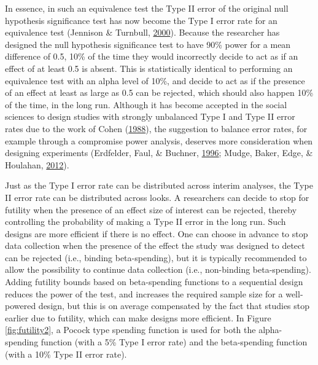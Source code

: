 \documentclass[
  english,
  ,man,floatsintext]{apa6}
\begin{document}
In essence, in such an equivalence test the Type II error of the original null hypothesis significance test has now become the Type I error rate for an equivalence test (Jennison \& Turnbull, \protect\hyperlink{ref-jennison_group_2000}{2000}). Because the researcher has designed the null hypothesis significance test to have 90\% power for a mean difference of 0.5, 10\% of the time they would incorrectly decide to act as if an effect of at least 0.5 is absent. This is statistically identical to performing an equivalence test with an alpha level of 10\%, and decide to act as if the presence of an effect at least as large as 0.5 can be rejected, which should also happen 10\% of the time, in the long run. Although it has become accepted in the social sciences to design studies with strongly unbalanced Type I and Type II error rates due to the work of Cohen (\protect\hyperlink{ref-cohen_statistical_1988}{1988}), the suggestion to balance error rates, for example through a compromise power analysis, deserves more consideration when designing experiments (Erdfelder, Faul, \& Buchner, \protect\hyperlink{ref-erdfelder_gpower_1996}{1996}; Mudge, Baker, Edge, \& Houlahan, \protect\hyperlink{ref-mudge_setting_2012}{2012}).

Just as the Type I error rate can be distributed across interim analyses, the Type II error rate can be distributed across looks. A researchers can decide to stop for futility when the presence of an effect size of interest can be rejected, thereby controlling the probability of making a Type II error in the long run. Such designs are more efficient if there is no effect. One can choose in advance to stop data collection when the presence of the effect the study was designed to detect can be rejected (i.e., binding beta-spending), but it is typically recommended to allow the possibility to continue data collection (i.e., non-binding beta-spending). Adding futility bounds based on beta-spending functions to a sequential design reduces the power of the test, and increases the required sample size for a well-powered design, but this is on average compensated by the fact that studies stop earlier due to futility, which can make designs more efficient. In Figure \ref{fig:futility2}, a Pocock type spending function is used for both the alpha-spending function (with a 5\% Type I error rate) and the beta-spending function (with a 10\% Type II error rate).
\end{document}

